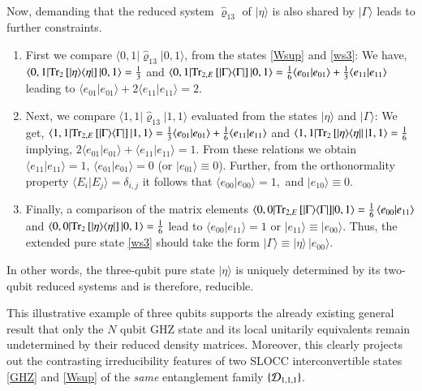 {\begin{align}
\end{align}
Now, demanding that the reduced system $\hat{\varrho}_{13}$ of $\vert \eta\rangle$ is also shared by  $\vert \Gamma\rangle$ leads to further constraints.  
\begin{enumerate}
\item First we compare  $\langle 0,1\vert \hat{\varrho}_{13}\vert 0,1\rangle$,  from the states \eqref{Wsup} and \eqref{ws3}: We have, $\langle 0,1|{\rm Tr}_{2}\,[\vert\eta\rangle \langle\eta\vert]\, |0,1\rangle= \frac{1}{3}$ and $\langle 0,1|{\rm Tr}_{2,E}\,[\vert\Gamma\rangle \langle\Gamma\vert]\, |0,1\rangle= \frac{1}{6}\langle e_{01}|e_{01}\rangle+\frac{1}{3}\langle e_{11}|e_{11}\rangle$ leading to $\langle e_{01}|e_{01}\rangle+2\langle e_{11}|e_{11}\rangle=2$. 

\item Next, we compare  $\langle 1,1\vert \hat{\varrho}_{13}\vert 1,1\rangle$ evaluated from the states $\vert\eta\rangle$ and $\vert\Gamma\rangle$: We get, $\langle 1,1|{\rm Tr}_{2, E}\, [|\Gamma\rangle \langle\Gamma|]\,\vert 1,1\rangle=\frac{1}{3}\langle e_{01}|e_{01}\rangle+\frac{1}{6}\langle e_{11}|e_{11}\rangle$ and $\langle 1,1|{\rm Tr}_{2}\, [|\eta\rangle \langle\eta|\vert\, |1,1\rangle=\frac{1}{6}$ implying, $2\langle e_{01}|e_{01}\rangle+\langle e_{11}|e_{11}\rangle=1$. From these relations we obtain $\langle e_{11}|e_{11}\rangle=1$, $\langle e_{01}|e_{01}\rangle=0$ (or $\vert e_{01}\rangle\equiv 0$). Further, from the orthonormality property $\langle E_i\vert E_j\rangle=\delta_{i,j}$ it follows that $\langle e_{00}\vert e_{00}\rangle=1,$ and $\vert e_{10}\rangle\equiv 0$. 

\item Finally, a comparison of the matrix elements $\langle 0,0|{\rm Tr}_{2,E}\,[\vert\Gamma\rangle \langle\Gamma\vert]\break |0,1\rangle= \frac{1}{6}\, \langle e_{00}|e_{11}\rangle$ and  $\langle 0,0|{\rm Tr}_{2}\,[\vert\eta\rangle \langle\eta\vert]\, |0,1\rangle= \frac{1}{6}$ lead to $\langle e_{00}|e_{11}\rangle=1$ or $\vert e_{11}\rangle\equiv \vert e_{00}\rangle$. Thus,  the extended pure state \eqref{ws3} should take the form $\vert \Gamma\rangle\equiv \vert \eta\rangle \, \vert e_{00}\rangle$. 
\end{enumerate}
In other words,  the three-qubit pure state $\vert \eta\rangle$  is uniquely determined by its two-qubit reduced systems and is therefore, reducible. 

This illustrative example of three qubits supports the already existing general result \cite{Walck,Walck2} that only the $N$ qubit GHZ state and its local unitarily equivalents remain undetermined by their reduced density matrices. Moreover, this clearly projects out the contrasting  irreducibility features of two SLOCC interconvertible states \eqref{GHZ} and \eqref{Wsup} of the {\em same} entanglement family $\{{\cal D}_{1,1,1}\}$.   

}
